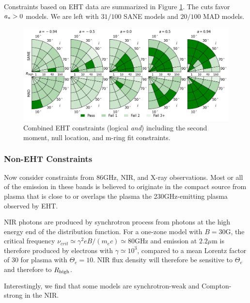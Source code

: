 
Constraints based on EHT data are summarized in Figure \ref{fig:all_EHT_constraints}.  The cuts favor $a_* > 0$ models.  We are left with $31/100$ SANE models and $20/100$ MAD models.

\begin{figure}
  \centering
    \includegraphics[width=\textwidth]{./figures/Interferometric_Constraints.png}
  \caption{Combined EHT constraints (logical {\em and}) including the second moment, null location, and m-ring fit constraints.}
  \label{fig:all_EHT_constraints}
\end{figure}

\subsubsection{Non-EHT Constraints}

Now consider constraints from 86GHz, NIR, and X-ray observations.  Most or all of the emission in these bands is believed to originate in the compact source from plasma that is close to or overlaps the plasma the 230GHz-emitting plasma observed by EHT.


NIR photons are produced by synchrotron process from photons at the high energy end of the distribution function.  For a one-zone model with $B = 30$G, the  critical frequency $\nu_{crit} \simeq \gamma^2 e B/(m_e c) \simeq 80$GHz and emission at $2.2\mu$m is therefore produced by electrons with $\gamma \simeq 10^3$, compared to a mean Lorentz factor of $30$ for plasma with $\Theta_e = 10$.  NIR flux density will therefore be sensitive to $\Theta_e$ and therefore to $R_\mathrm{high}$.

Interestingly, we find that some models are synchrotron-weak and Compton-strong in the NIR.  

